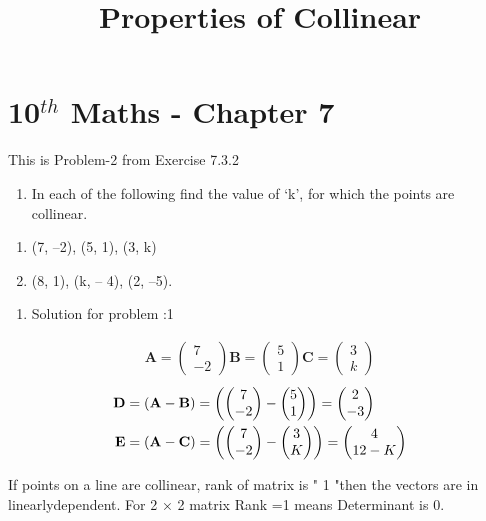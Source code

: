 \documentclass[12pt]{article}
\newcommand{\myvec}[1]{\ensuremath{\begin{pmatrix}#1\end{pmatrix}}}
\let\vec\mathbf
\providecommand{\brak}[1]{\ensuremath{\left(#1\right)}}
\let\vec\mathbf
\begin{document}
\begin{center}
\title{\textbf{Properties of Collinear}}
\date{\vspace{-5ex}} %
\maketitle
\end{center}

\setcounter{page}{1}

\section{10$^{th}$ Maths - Chapter 7}

This is Problem-2 from Exercise 7.3.2

\begin{enumerate}
\item In each of the following find the value of ‘k’, for which the points are collinear.
\end{enumerate}
\begin{enumerate}
\item (7, –2), (5, 1), (3, k) \\
\item (8, 1), (k, – 4), (2, –5).\\
\end{enumerate}
\begin{enumerate}
\item Solution for problem :1
\end{enumerate}
\begin{align}  
\vec{A}=\myvec{7 \\-2}
\vec{B}=\myvec{5 \\ 1}
\vec{C}=\myvec{3 \\ k}
\end{align}
\begin{align}
\vec{D} &=\brak{\vec{A}-\vec{B}} = \brak{\myvec{7 \\-2 } - \myvec{5 \\1 } } = \myvec{2 \\ -3 }\\
\vec{E} &= \brak{\vec{A}-\vec{C}} = \brak{\myvec{7 \\ -2 } - \myvec{3 \\K } } = \myvec{4 \\1\-2-K}
\end{align}

 If points on a line  are  collinear, rank of matrix is " 1 "then the vectors are in linearlydependent.
For 2 × 2 matrix Rank =1 means Determinant is 0.
\end{document}
